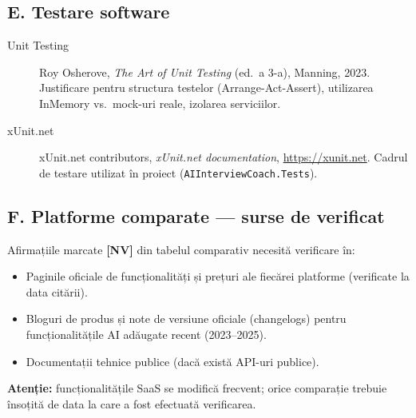 \subsection*{E. Testare software}

\begin{description}
  \item[Unit Testing]
    Roy Osherove, \emph{The Art of Unit Testing} (ed.\ a 3-a),
    Manning, 2023.
    Justificare pentru structura testelor (Arrange-Act-Assert),
    utilizarea InMemory vs.\ mock-uri reale, izolarea serviciilor.

  \item[xUnit.net]
    xUnit.net contributors, \emph{xUnit.net documentation},
    \url{https://xunit.net}.
    Cadrul de testare utilizat în proiect (\texttt{AIInterviewCoach.Tests}).
\end{description}

\subsection*{F. Platforme comparate — surse de verificat}

Afirmațiile marcate \textbf{[NV]} din tabelul comparativ necesită
verificare în:

\begin{itemize}
  \item Paginile oficiale de funcționalități și prețuri ale fiecărei
        platforme (verificate la data citării).
  \item Bloguri de produs și note de versiune oficiale (changelogs)
        pentru funcționalitățile AI adăugate recent (2023--2025).
  \item Documentații tehnice publice (dacă există API-uri publice).
\end{itemize}

\noindent
\textbf{Atenție:} funcționalitățile SaaS se modifică frecvent; orice
comparație trebuie însoțită de data la care a fost efectuată verificarea.
